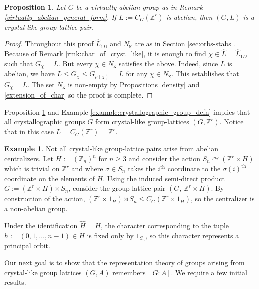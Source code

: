 \documentclass[11pt, twoside]{amsart}
\newcommand{\te}[1]{\operatorname{#1}}
\newcommand{\zn}{\mathbb{Z}}
\newcommand{\mt}{\mathtt}
\newcommand{\wh}{\widehat}
\newtheorem{prop}[thm]{Proposition}
\theoremstyle{definition}
\newtheorem{ex}[thm]{Example}
\newcommand{\B}{\mathbb}
\newcommand{\Z}{\B{Z}}
\begin{document}
\begin{prop}\label{prop:implies_crystal-like}
Let $G$ be a virtually abelian group as in Remark \ref{virtually_abelian_general_form}. If $L:=C_G(\Z^r)$ is abelian, then $(G,L)$ is a crystal-like group-lattice pair. 
\end{prop}

\begin{proof}
Throughout this proof $\wh{L}_{1D}$ and $N_{\mt{K}}$ are as in Section \ref{sec:orbs-stabs}. Because of Remark \ref{rmk:char_of_cryst_like}, it is enough to find $\chi\in \widehat{L}=\wh{L}_{1D}$ such that $G_{\chi}=L$. But every $\chi\in N_{\mt{K}}$ satisfies the above. Indeed, since $L$ is abelian, we have $L\leq G_{\chi}\leq G_{\rho(\chi)}=L$ for any $\chi\in N_{\mt{K}}$. This establishes that $G_{\chi}=L$. The set $N_{\mt K}$ is non-empty by Propositions \ref{density} and \ref{extension_of_char} so the proof is complete. \qedhere
\par

\end{proof}

Proposition \ref{prop:implies_crystal-like} and Example \ref{example:crystallographic_group_defn} implies that all crystallographic groups $G$ form crystal-like group-lattices $(G,\zn^r)$. Notice that in this case $L=C_G(\zn^r)=\Z^r$.

\begin{ex}


    Not all crystal-like group-lattice pairs arise from abelian centralizers. Let $H:=(\Z_n)^n$ for $n\geq3$ and consider the action $S_n\curvearrowright(\Z^r\times H)$ which is trivial on $\Z^r$ and where $\sigma\in S_n$ takes the $i^{\te{th}}$ coordinate to the $\sigma(i)^{\te{th}}$ coordinate on the elements of $H$. Using the induced semi-direct product $G:=(\Z^r\times H)\rtimes S_n$,  consider the group-lattice pair $(G,\ \Z^r\times H)$. By construction of the action, $(\Z^r\times1_H)\rtimes S_n\leq C_G(\Z^r\times1_H)$, so the centralizer is a non-abelian group.

    Under the identification $\wh{H}=H$, the character corresponding to the tuple $h:=(0,1,\dots,n-1)\in H$ is fixed only by $1_{S_n}$, so this character represents a principal orbit.
\end{ex}



Our next goal is to show that the representation theory of groups arising from crystal-like group lattices $(G,A)$ remembers $[G:A]$. We require a few initial results.
\end{document}
